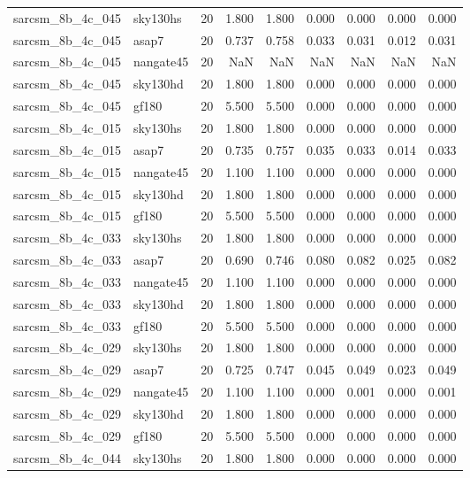 \begin{tabular}{llrrrrrrr}
sarcsm\_8b\_4c\_045 & sky130hs & 20 & 1.800 & 1.800 & 0.000 & 0.000 & 0.000 & 0.000 \\
sarcsm\_8b\_4c\_045 & asap7 & 20 & 0.737 & 0.758 & 0.033 & 0.031 & 0.012 & 0.031 \\
sarcsm\_8b\_4c\_045 & nangate45 & 20 & NaN & NaN & NaN & NaN & NaN & NaN \\
sarcsm\_8b\_4c\_045 & sky130hd & 20 & 1.800 & 1.800 & 0.000 & 0.000 & 0.000 & 0.000 \\
sarcsm\_8b\_4c\_045 & gf180 & 20 & 5.500 & 5.500 & 0.000 & 0.000 & 0.000 & 0.000 \\
sarcsm\_8b\_4c\_015 & sky130hs & 20 & 1.800 & 1.800 & 0.000 & 0.000 & 0.000 & 0.000 \\
sarcsm\_8b\_4c\_015 & asap7 & 20 & 0.735 & 0.757 & 0.035 & 0.033 & 0.014 & 0.033 \\
sarcsm\_8b\_4c\_015 & nangate45 & 20 & 1.100 & 1.100 & 0.000 & 0.000 & 0.000 & 0.000 \\
sarcsm\_8b\_4c\_015 & sky130hd & 20 & 1.800 & 1.800 & 0.000 & 0.000 & 0.000 & 0.000 \\
sarcsm\_8b\_4c\_015 & gf180 & 20 & 5.500 & 5.500 & 0.000 & 0.000 & 0.000 & 0.000 \\
sarcsm\_8b\_4c\_033 & sky130hs & 20 & 1.800 & 1.800 & 0.000 & 0.000 & 0.000 & 0.000 \\
sarcsm\_8b\_4c\_033 & asap7 & 20 & 0.690 & 0.746 & 0.080 & 0.082 & 0.025 & 0.082 \\
sarcsm\_8b\_4c\_033 & nangate45 & 20 & 1.100 & 1.100 & 0.000 & 0.000 & 0.000 & 0.000 \\
sarcsm\_8b\_4c\_033 & sky130hd & 20 & 1.800 & 1.800 & 0.000 & 0.000 & 0.000 & 0.000 \\
sarcsm\_8b\_4c\_033 & gf180 & 20 & 5.500 & 5.500 & 0.000 & 0.000 & 0.000 & 0.000 \\
sarcsm\_8b\_4c\_029 & sky130hs & 20 & 1.800 & 1.800 & 0.000 & 0.000 & 0.000 & 0.000 \\
sarcsm\_8b\_4c\_029 & asap7 & 20 & 0.725 & 0.747 & 0.045 & 0.049 & 0.023 & 0.049 \\
sarcsm\_8b\_4c\_029 & nangate45 & 20 & 1.100 & 1.100 & 0.000 & 0.001 & 0.000 & 0.001 \\
sarcsm\_8b\_4c\_029 & sky130hd & 20 & 1.800 & 1.800 & 0.000 & 0.000 & 0.000 & 0.000 \\
sarcsm\_8b\_4c\_029 & gf180 & 20 & 5.500 & 5.500 & 0.000 & 0.000 & 0.000 & 0.000 \\
sarcsm\_8b\_4c\_044 & sky130hs & 20 & 1.800 & 1.800 & 0.000 & 0.000 & 0.000 & 0.000 \\

\end{tabular}
